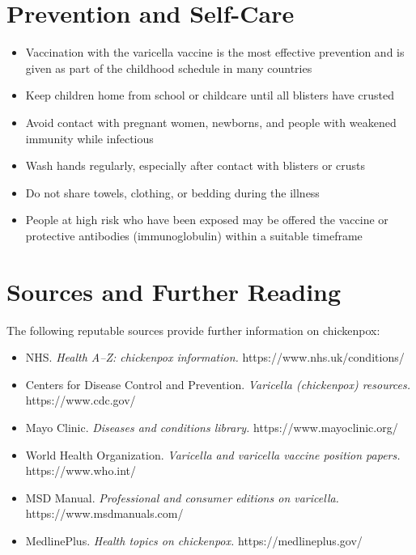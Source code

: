\section*{Prevention and Self-Care}
\begin{itemize}
    \item Vaccination with the varicella vaccine is the most effective prevention and is given as part of the childhood schedule in many countries
    \item Keep children home from school or childcare until all blisters have crusted
    \item Avoid contact with pregnant women, newborns, and people with weakened immunity while infectious
    \item Wash hands regularly, especially after contact with blisters or crusts
    \item Do not share towels, clothing, or bedding during the illness
    \item People at high risk who have been exposed may be offered the vaccine or protective antibodies (immunoglobulin) within a suitable timeframe
\end{itemize}

\section*{Sources and Further Reading}
The following reputable sources provide further information on chickenpox:
\begin{itemize}
    \item NHS. \textit{Health A--Z: chickenpox information.} https://www.nhs.uk/conditions/
    \item Centers for Disease Control and Prevention. \textit{Varicella (chickenpox) resources.} https://www.cdc.gov/
    \item Mayo Clinic. \textit{Diseases and conditions library.} https://www.mayoclinic.org/
    \item World Health Organization. \textit{Varicella and varicella vaccine position papers.} https://www.who.int/
    \item MSD Manual. \textit{Professional and consumer editions on varicella.} https://www.msdmanuals.com/
    \item MedlinePlus. \textit{Health topics on chickenpox.} https://medlineplus.gov/
\end{itemize}
